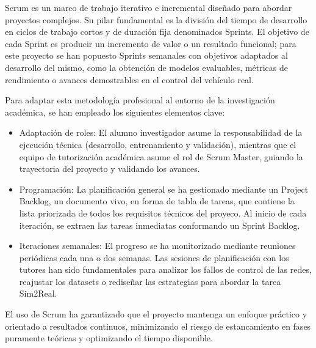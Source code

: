\documentclass[12pt,a4paper,onecolumn,oneside]{report}
\begin{document}
Scrum es un marco de trabajo iterativo e incremental diseñado para abordar proyectos complejos. Su pilar fundamental es la división del tiempo de desarrollo en ciclos de trabajo cortos y de duración fija denominados Sprints. El objetivo de cada Sprint es producir un incremento de valor o un resultado funcional; para este proyecto se han popuesto Sprints semanales con objetivos adaptados al desarrollo del mismo, como la obtención de modelos evaluables, métricas de rendimiento o avances demostrables en el control del vehículo real.

Para adaptar esta metodología profesional al entorno de la investigación académica, se han empleado los siguientes elementos clave:

\begin{itemize}

\item Adaptación de roles: El alumno investigador asume la responsabilidad de la ejecución técnica (desarrollo, entrenamiento y validación), mientras que el equipo de tutorización académica asume el rol de Scrum Master, guiando la trayectoria del proyecto y validando los avances.

\item Programación: La planificación general se ha gestionado mediante un Project Backlog, un documento vivo, en forma de tabla de tareas, que contiene la lista priorizada de todos los requisitos técnicos del proyeco. Al inicio de cada iteración, se extraen las tareas inmediatas conformando un Sprint Backlog.

\item Iteraciones semanales: El progreso se ha monitorizado mediante reuniones periódicas cada una o dos semanas. Las sesiones de planificación con los tutores han sido fundamentales para analizar los fallos de control de las redes, reajustar los datasets o rediseñar las estrategias para abordar la tarea Sim2Real.
\end{itemize}

El uso de Scrum ha garantizado que el proyecto mantenga un enfoque práctico y orientado a resultados continuos, minimizando el riesgo de estancamiento en fases puramente teóricas y optimizando el tiempo disponible.
\end{document}
